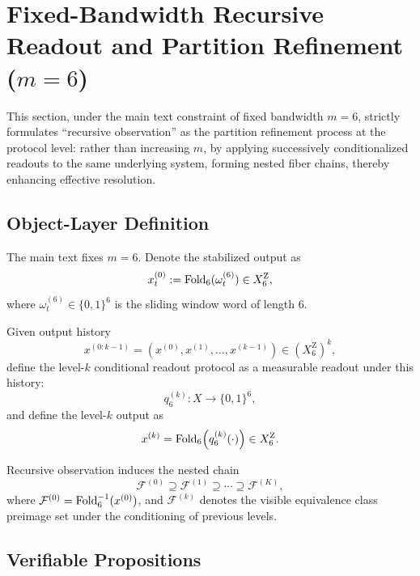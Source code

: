 \section{Fixed-Bandwidth Recursive Readout and Partition Refinement (\texorpdfstring{$m=6$}{m=6})}

This section, under the main text constraint of fixed bandwidth $m=6$, strictly formulates ``recursive observation'' as the partition refinement process at the protocol level: rather than increasing $m$, by applying successively conditionalized readouts to the same underlying system, forming nested fiber chains, thereby enhancing effective resolution.

\subsection{Object-Layer Definition}

\begin{definition}\label{def:fw-rec-level0}
The main text fixes $m=6$. Denote the stabilized output as
$$
x^{(0)}_t:=\mathrm{Fold}_6(\omega_t^{(6)})\in X_6^{\mathrm Z},
$$
where $\omega_t^{(6)}\in\{0,1\}^6$ is the sliding window word of length $6$.
\end{definition}

\begin{definition}\label{def:fw-rec-levelk}
Given output history
$$
x^{(0:k-1)}=(x^{(0)},x^{(1)},\dots,x^{(k-1)})\in (X_6^{\mathrm Z})^{k},
$$
define the level-$k$ conditional readout protocol as a measurable readout under this history:
$$
q_6^{(k)}:X\to \{0,1\}^6,
$$
and define the level-$k$ output as
$$
x^{(k)}=\mathrm{Fold}_6\!\left(q_6^{(k)}(\cdot)\right)\in X_6^{\mathrm Z}.
$$
\end{definition}

\begin{definition}\label{def:fw-rec-nested}
Recursive observation induces the nested chain
$$
\mathcal{F}^{(0)}\supseteq \mathcal{F}^{(1)}\supseteq \cdots \supseteq \mathcal{F}^{(K)},
$$
where $\mathcal{F}^{(0)}=\mathrm{Fold}_6^{-1}(x^{(0)})$, and $\mathcal{F}^{(k)}$ denotes the visible equivalence class preimage set under the conditioning of previous levels.
\end{definition}

\subsection{Verifiable Propositions}

